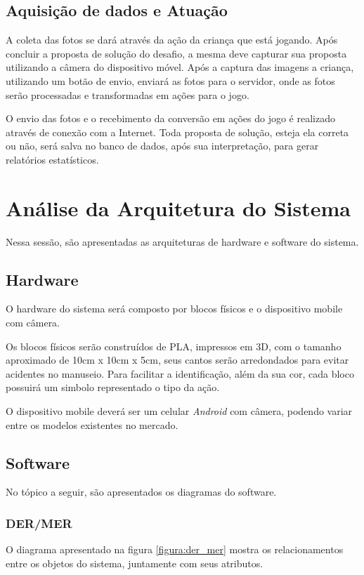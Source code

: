     \subsection{Aquisição de dados e Atuação}
    A coleta das fotos se dará através da ação da criança que está jogando. Após concluir a proposta de solução do desafio, a mesma deve capturar sua proposta utilizando a câmera do dispositivo móvel.
    Após a captura das imagens a criança, utilizando um botão de envio, enviará as fotos para o servidor, onde as fotos serão processadas e transformadas em ações para o jogo.
    
    O envio das fotos e o recebimento da conversão em ações do jogo é realizado através de conexão com a Internet.
    Toda proposta de solução, esteja ela correta ou não, será salva no banco de dados, após sua interpretação, para gerar relatórios estatísticos.


\section{Análise da Arquitetura do Sistema}
    Nessa sessão, são apresentadas as arquiteturas de hardware e software do sistema.

    \subsection{Hardware}
    O hardware do sistema será composto por blocos físicos e o dispositivo mobile com câmera.
    
    Os blocos físicos serão construídos de PLA, impressos em 3D, com o tamanho aproximado de 10cm x 10cm x 5cm, seus cantos serão arredondados para evitar acidentes no manuseio. Para facilitar a identificação, além da sua cor, cada bloco possuirá um simbolo representado o tipo da ação.
    
    O dispositivo mobile deverá ser um celular \textit{Android} com câmera, podendo variar entre os modelos existentes no mercado.
    
    \subsection{Software}
     No tópico a seguir, são apresentados os diagramas do software.
        
        \subsubsection{DER/MER}
        O diagrama apresentado na figura \ref{figura:der_mer} mostra os relacionamentos entre os objetos do sistema, juntamente com seus atributos.
        
